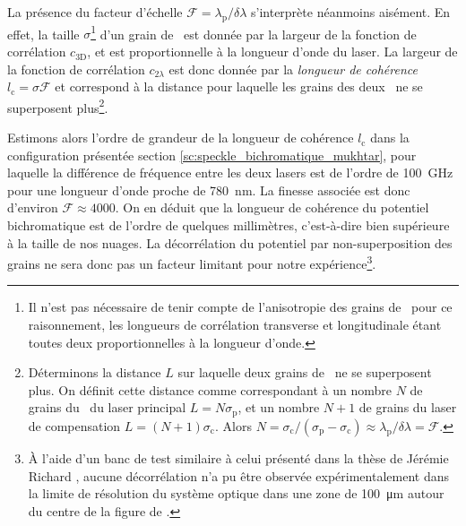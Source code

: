 La présence du facteur d'échelle $\mathcal{F}=\lambda_{\mathrm{p}}/\delta \lambda$ s'interprète néanmoins aisément. En effet, la taille $\sigma$\footnote{Il n'est pas nécessaire de tenir compte de l'anisotropie des grains de \speckle\ pour ce raisonnement, les longueurs de corrélation transverse et longitudinale étant toutes deux proportionnelles à la longueur d'onde.} d'un grain de \speckle\ est donnée par la largeur de la fonction de corrélation $c_{\mathrm{3D}}$, et est proportionnelle à la longueur d'onde du laser. La largeur de la fonction de corrélation $c_{\mathrm{2}\lambda}$ est donc donnée par la \emph{longueur de cohérence} $l_{\mathrm{c}}=\sigma \mathcal{F}$ et correspond à la distance pour laquelle les grains des deux \speckles\ ne se superposent plus\footnote{Déterminons la distance $L$ sur laquelle deux grains de \speckle\ ne se superposent plus. On définit cette distance comme correspondant à un nombre $N$ de grains du \speckle\ du laser principal $L=N\sigma_{\mathrm{p}}$, et un nombre $N+1$ de grains du laser de compensation $L=(N+1)\sigma_{\mathrm{c}}$. Alors $N=\sigma_{\mathrm{c}}/(\sigma_{\mathrm{p}}-\sigma_{\mathrm{c}})\approx \lambda_{\mathrm{p}}/\delta\lambda=\mathcal{F}$.}.


Estimons alors l'ordre de grandeur de la longueur de cohérence $l_{\mathrm{c}}$ dans la configuration présentée section \ref{sc:speckle_bichromatique_mukhtar}, pour laquelle la différence de fréquence entre les deux lasers est de l'ordre de \SI{100}{\giga\hertz} pour une longueur d'onde proche de \SI{780}{\nano\metre}. La finesse associée est donc d'environ $\mathcal{F}\approx 4000$. On en déduit que la longueur de cohérence du potentiel bichromatique est de l'ordre de quelques millimètres, c'est-à-dire bien supérieure à la taille de nos nuages. La décorrélation du potentiel par non-superposition des grains ne sera donc pas un facteur limitant pour notre expérience\footnote{À l'aide d'un banc de test similaire à celui présenté dans la thèse de Jérémie Richard \citep{richard2015propagation}, aucune décorrélation n'a pu être observée expérimentalement dans la limite de résolution du système optique dans une zone de \SI{100}{\micro\metre} autour du centre de la figure de \speckle .}.




